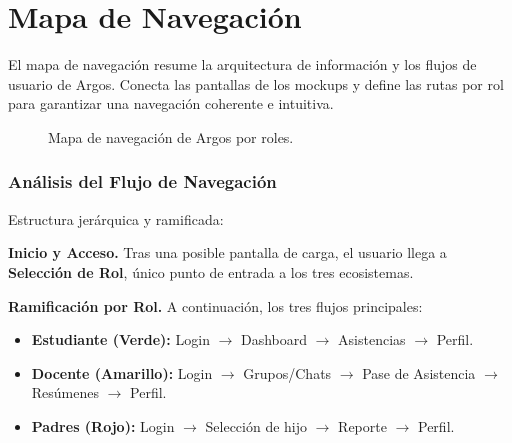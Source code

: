 \section{Mapa de Navegación}

El mapa de navegación resume la arquitectura de información y los flujos de usuario de Argos. Conecta las pantallas de los mockups y define las rutas por rol para garantizar una navegación coherente e intuitiva.

\begin{samepage}\small\setlength{\parskip}{0.25\baselineskip}
\begin{figure}[H]
	\centering
	\caption{Mapa de navegación de Argos por roles.}\label{fig:mapa-navegacion}
\end{figure}

\subsubsection*{Análisis del Flujo de Navegación}
\vspace{0.2\baselineskip}
Estructura jerárquica y ramificada:

\noindent \textbf{Inicio y Acceso.} Tras una posible pantalla de carga, el usuario llega a \textbf{Selección de Rol}, único punto de entrada a los tres ecosistemas.

\noindent \textbf{Ramificación por Rol.} A continuación, los tres flujos principales:
\begin{itemize}\setlength{\itemsep}{0.35em}\setlength{\parsep}{0.1em}\setlength{\parskip}{0pt}
	\item \textbf{Estudiante (Verde):} Login $\rightarrow$ Dashboard $\rightarrow$ Asistencias $\rightarrow$ Perfil.
	\item \textbf{Docente (Amarillo):} Login $\rightarrow$ Grupos/Chats $\rightarrow$ Pase de Asistencia $\rightarrow$ Resúmenes $\rightarrow$ Perfil.
	\item \textbf{Padres (Rojo):} Login $\rightarrow$ Selección de hijo $\rightarrow$ Reporte $\rightarrow$ Perfil.
\end{itemize}


\end{samepage}
